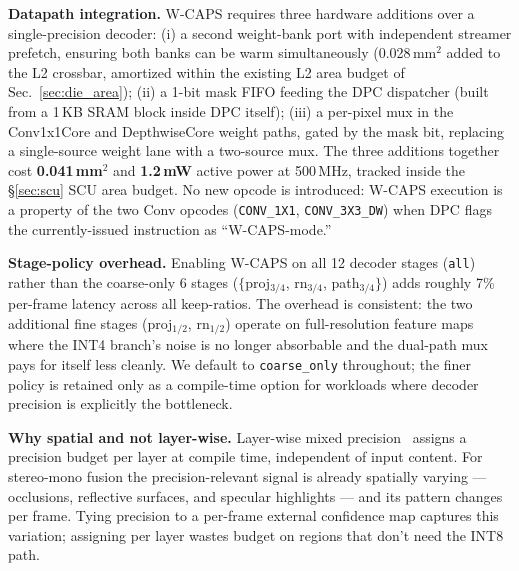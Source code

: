 \documentclass[journal]{IEEEtran}
\begin{document}
\textbf{Datapath integration.} W-CAPS requires three hardware additions over a single-precision decoder: (i) a second weight-bank port with independent streamer prefetch, ensuring both banks can be warm simultaneously (0.028\,mm$^2$ added to the L2 crossbar, amortized within the existing L2 area budget of Sec.~\ref{sec:die_area}); (ii) a 1-bit mask FIFO feeding the DPC dispatcher (built from a 1\,KB SRAM block inside DPC itself); (iii) a per-pixel mux in the Conv1x1Core and DepthwiseCore weight paths, gated by the mask bit, replacing a single-source weight lane with a two-source mux. The three additions together cost \textbf{0.041\,mm$^2$} and \textbf{1.2\,mW} active power at 500\,MHz, tracked inside the \S\ref{sec:scu} SCU area budget. No new opcode is introduced: W-CAPS execution is a property of the two Conv opcodes (\texttt{CONV\_1X1}, \texttt{CONV\_3X3\_DW}) when DPC flags the currently-issued instruction as ``W-CAPS-mode.''

\textbf{Stage-policy overhead.} Enabling W-CAPS on all 12 decoder stages (\texttt{all}) rather than the coarse-only 6 stages ($\{$proj$_{3/4}$, rn$_{3/4}$, path$_{3/4}\}$) adds roughly 7\% per-frame latency across all keep-ratios. The overhead is consistent: the two additional fine stages (proj$_{1/2}$, rn$_{1/2}$) operate on full-resolution feature maps where the INT4 branch's noise is no longer absorbable and the dual-path mux pays for itself less cleanly. We default to \texttt{coarse\_only} throughout; the finer policy is retained only as a compile-time option for workloads where decoder precision is explicitly the bottleneck.

\textbf{Why spatial and not layer-wise.} Layer-wise mixed precision~\cite{sharma2018bitfusion,park2019olaccel} assigns a precision budget per layer at compile time, independent of input content. For stereo-mono fusion the precision-relevant signal is already spatially varying --- occlusions, reflective surfaces, and specular highlights --- and its pattern changes per frame. Tying precision to a per-frame external confidence map captures this variation; assigning per layer wastes budget on regions that don't need the INT8 path.
\end{document}
